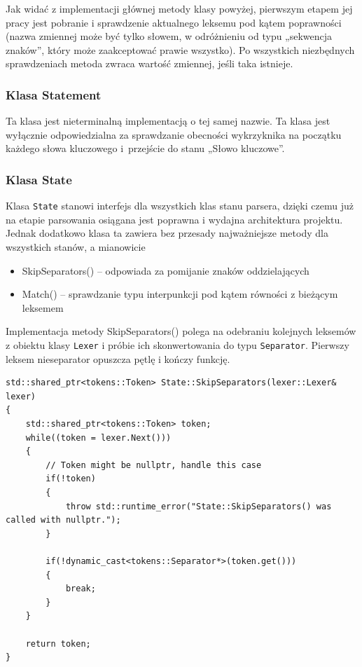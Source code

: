 Jak widać z implementacji głównej metody klasy powyżej, pierwszym etapem jej pracy jest pobranie i sprawdzenie aktualnego leksemu pod kątem poprawności (nazwa zmiennej może być tylko słowem, w odróżnieniu od typu „sekwencja znaków”, który może zaakceptować prawie wszystko). Po wszystkich niezbędnych sprawdzeniach metoda zwraca wartość zmiennej, jeśli taka istnieje.

\subsubsection{Klasa Statement}

Ta klasa jest nieterminalną implementacją o tej samej nazwie. Ta klasa jest wyłącznie odpowiedzialna za sprawdzanie obecności wykrzyknika na początku każdego słowa kluczowego i~przejście do stanu „Słowo kluczowe”.

\subsubsection{Klasa State}

Klasa \texttt{State} stanowi interfejs dla wszystkich klas stanu parsera, dzięki czemu już na etapie parsowania osiągana jest poprawna i wydajna architektura projektu. Jednak dodatkowo klasa ta zawiera bez przesady najważniejsze metody dla wszystkich stanów, a mianowicie

\begin{itemize}
	\item SkipSeparators() -- odpowiada za pomijanie znaków oddzielających
	\item Match() -- sprawdzanie typu interpunkcji pod kątem równości z bieżącym leksemem
\end{itemize}

Implementacja metody SkipSeparators() polega na odebraniu kolejnych leksemów z obiektu klasy \texttt{Lexer} i próbie ich skonwertowania do typu \texttt{Separator}. Pierwszy leksem nieseparator opuszcza pętlę i kończy funkcję.

\begin{lstlisting}[label=list:separator_skip,caption=Metoda State::SkipSeparators(),basicstyle=\footnotesize\ttfamily]
std::shared_ptr<tokens::Token> State::SkipSeparators(lexer::Lexer& lexer)
{
    std::shared_ptr<tokens::Token> token;
    while((token = lexer.Next()))
    {
        // Token might be nullptr, handle this case
        if(!token)
        {
            throw std::runtime_error("State::SkipSeparators() was called with nullptr.");
        }
    
        if(!dynamic_cast<tokens::Separator*>(token.get()))
        {
            break;
        }
    }
    
    return token;
}
\end{lstlisting}

